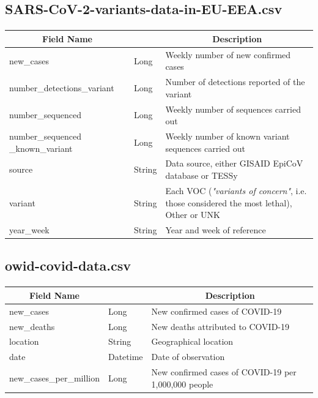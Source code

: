 \documentclass[a4paper,12pt]{article}
\begin{document}
\newpage
\subsection{SARS-CoV-2-variants-data-in-EU-EEA.csv}
\paragraph{}
\begin{center}
\begin{tabular}{|m{45mm}|>{\raggedright}m{16mm}|m{75mm}|}
\hline
\multicolumn{1}{|c|}{\textbf{ Field Name }}
& \multicolumn{1}{c|}{\textbf{ Data Type }} 
    	& \multicolumn{1}{c|}{\textbf{ Description }}\\
\hline
new\_cases & Long & Weekly number of new confirmed cases \\
\hline
number\_detections\_variant & Long & Number of detections reported of the variant \\
\hline
number\_sequenced & Long & Weekly number of sequences carried out \\
\hline
number\_sequenced \_known\_variant & Long & Weekly number of known variant sequences carried out \\
\hline
source & String & Data source, either GISAID EpiCoV database or TESSy \\
\hline
variant & String & Each VOC (\emph{"variants of concern"}, i.e. those considered the most lethal), Other or UNK \\
\hline
year\_week & String & Year and week of reference \\
\hline
\end{tabular}
\end{center}

\subsection{owid-covid-data.csv}
\paragraph{}
\begin{center}
\begin{tabular}{|m{45mm}|>{\raggedright}m{16mm}|m{75mm}|}
\hline
\multicolumn{1}{|c|}{\textbf{ Field Name }}
& \multicolumn{1}{c|}{\textbf{ Data Type }} 
    	& \multicolumn{1}{c|}{\textbf{ Description }}\\
\hline
new\_cases & Long & New confirmed cases of COVID-19 \\
\hline
new\_deaths & Long & New deaths attributed to COVID-19 \\
\hline
location & String & Geographical location \\
\hline
date & Datetime & Date of observation \\
\hline
new\_cases\_per\_million & Long & New confirmed cases of COVID-19 per 1,000,000 people \\
\hline
\end{tabular}
\end{center}
\newpage
\end{document}
